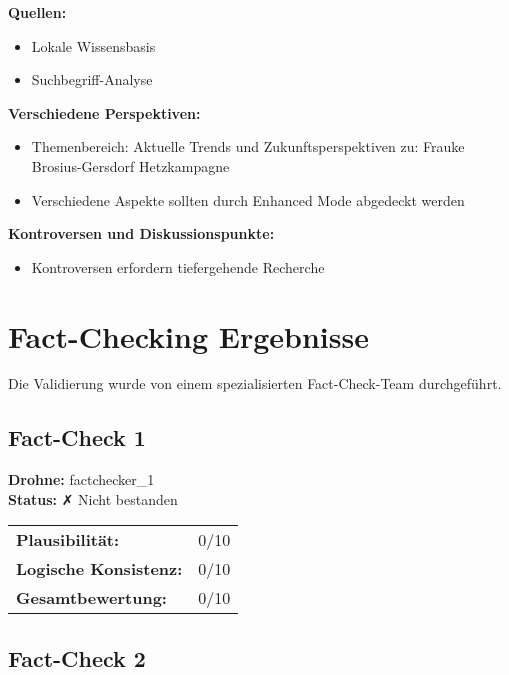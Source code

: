 \documentclass[12pt,a4paper]{article}
\begin{document}
\textbf{Quellen:}
\begin{itemize}
\item Lokale Wissensbasis
\item Suchbegriff-Analyse
\end{itemize}

\textbf{Verschiedene Perspektiven:}
\begin{itemize}
\item Themenbereich: Aktuelle Trends und Zukunftsperspektiven zu: Frauke Brosius-Gersdorf Hetzkampagne
\item Verschiedene Aspekte sollten durch Enhanced Mode abgedeckt werden
\end{itemize}

\textbf{Kontroversen und Diskussionspunkte:}
\begin{itemize}
\item Kontroversen erfordern tiefergehende Recherche
\end{itemize}


\newpage
\section{Fact-Checking Ergebnisse}

Die Validierung wurde von einem spezialisierten Fact-Check-Team durchgeführt.


\subsection{Fact-Check 1}

\textbf{Drohne:} factchecker\_1\\
\textbf{Status:} ✗ Nicht bestanden\\

\begin{tabular}{ll}
\textbf{Plausibilität:} & 0/10 \\
\textbf{Logische Konsistenz:} & 0/10 \\
\textbf{Gesamtbewertung:} & 0/10 \\
\end{tabular}


\subsection{Fact-Check 2}
\end{document}

